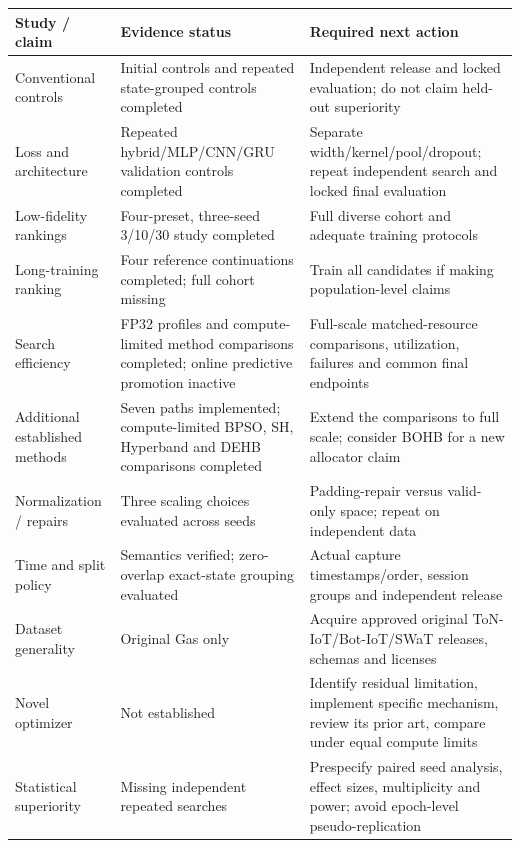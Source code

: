 \documentclass[11pt,a4paper]{report}
\begin{document}
\begin{longtable}{>{\raggedright\arraybackslash}p{.27\linewidth}>{\raggedright\arraybackslash}p{.28\linewidth}>{\raggedright\arraybackslash}p{.35\linewidth}}\toprule
Study / claim & Evidence status & Required next action\\\midrule\endhead
Conventional controls & Initial controls and repeated state-grouped controls completed & Independent release and locked evaluation; do not claim held-out superiority\\
Loss and architecture & Repeated hybrid/MLP/CNN/GRU validation controls completed & Separate width/kernel/pool/dropout; repeat independent search and locked final evaluation\\
Low-fidelity rankings & Four-preset, three-seed 3/10/30 study completed & Full diverse cohort and adequate training protocols\\
Long-training ranking & Four reference continuations completed; full cohort missing & Train all candidates if making population-level claims\\
Search efficiency & FP32 profiles and compute-limited method comparisons completed; online predictive promotion inactive & Full-scale matched-resource comparisons, utilization, failures and common final endpoints\\
Additional established methods & Seven paths implemented; compute-limited BPSO, SH, Hyperband and DEHB comparisons completed & Extend the comparisons to full scale; consider BOHB for a new allocator claim\\
Normalization / repairs & Three scaling choices evaluated across seeds & Padding-repair versus valid-only space; repeat on independent data\\
Time and split policy & Semantics verified; zero-overlap exact-state grouping evaluated & Actual capture timestamps/order, session groups and independent release\\
Dataset generality & Original Gas only & Acquire approved original ToN-IoT/Bot-IoT/SWaT releases, schemas and licenses\\
Novel optimizer & Not established & Identify residual limitation, implement specific mechanism, review its prior art, compare under equal compute limits\\
Statistical superiority & Missing independent repeated searches & Prespecify paired seed analysis, effect sizes, multiplicity and power; avoid epoch-level pseudo-replication\\\bottomrule
\end{longtable}
\end{document}
